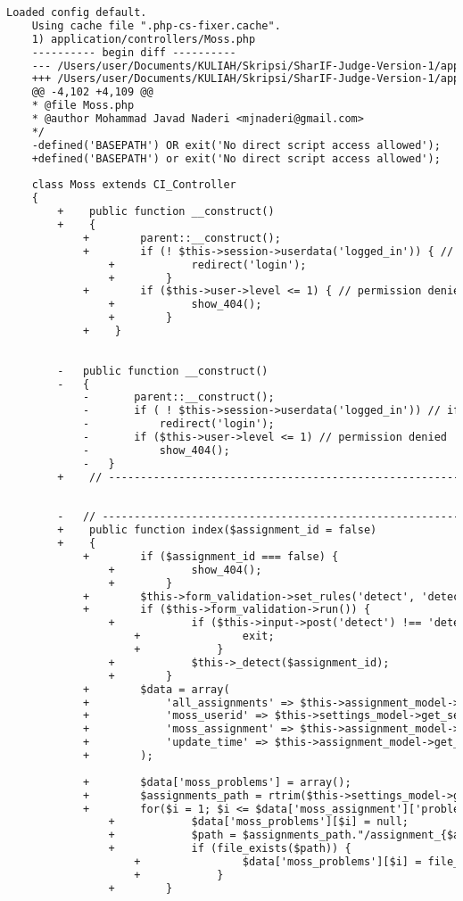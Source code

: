 \begin{lstlisting}[language=diff, caption=Perubahan pada kode Moss.php]
	Loaded config default.
	Using cache file ".php-cs-fixer.cache".
	1) application/controllers/Moss.php
	---------- begin diff ----------
	--- /Users/user/Documents/KULIAH/Skripsi/SharIF-Judge-Version-1/application/controllers/Moss.php
	+++ /Users/user/Documents/KULIAH/Skripsi/SharIF-Judge-Version-1/application/controllers/Moss.php
	@@ -4,102 +4,109 @@
	* @file Moss.php
	* @author Mohammad Javad Naderi <mjnaderi@gmail.com>
	*/
	-defined('BASEPATH') OR exit('No direct script access allowed');
	+defined('BASEPATH') or exit('No direct script access allowed');
	
	class Moss extends CI_Controller
	{
		+    public function __construct()
		+    {
			+        parent::__construct();
			+        if (! $this->session->userdata('logged_in')) { // if not logged in
				+            redirect('login');
				+        }
			+        if ($this->user->level <= 1) { // permission denied
				+            show_404();
				+        }
			+    }
		
		
		-	public function __construct()
		-	{
			-		parent::__construct();
			-		if ( ! $this->session->userdata('logged_in')) // if not logged in
			-			redirect('login');
			-		if ($this->user->level <= 1) // permission denied
			-			show_404();
			-	}
		+    // ------------------------------------------------------------------------
		
		
		-	// ------------------------------------------------------------------------
		+    public function index($assignment_id = false)
		+    {
			+        if ($assignment_id === false) {
				+            show_404();
				+        }
			+        $this->form_validation->set_rules('detect', 'detect', 'required');
			+        if ($this->form_validation->run()) {
				+            if ($this->input->post('detect') !== 'detect') {
					+                exit;
					+            }
				+            $this->_detect($assignment_id);
				+        }
			+        $data = array(
			+            'all_assignments' => $this->assignment_model->all_assignments(),
			+            'moss_userid' => $this->settings_model->get_setting('moss_userid'),
			+            'moss_assignment' => $this->assignment_model->assignment_info($assignment_id),
			+            'update_time' => $this->assignment_model->get_moss_time($assignment_id)
			+        );
			
			+        $data['moss_problems'] = array();
			+        $assignments_path = rtrim($this->settings_model->get_setting('assignments_root'), '/');
			+        for($i = 1; $i <= $data['moss_assignment']['problems']; $i++) {
				+            $data['moss_problems'][$i] = null;
				+            $path = $assignments_path."/assignment_{$assignment_id}/p{$i}/moss_link.txt";
				+            if (file_exists($path)) {
					+                $data['moss_problems'][$i] = file_get_contents($path);
					+            }
				+        }
			

\end{lstlisting}

